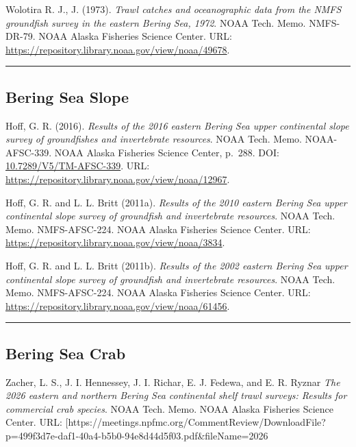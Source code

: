\documentclass[
  letterpaper,
  oneside,
  open=any]{scrbook}
\begin{document}
Wolotira R. J., J. (1973). \emph{Trawl catches and oceanographic data
from the NMFS groundfish survey in the eastern Bering Sea, 1972}. NOAA
Tech. Memo. NMFS-DR-79. NOAA Alaska Fisheries Science Center. URL:
\url{https://repository.library.noaa.gov/view/noaa/49678}.

\begin{center}\rule{0.5\linewidth}{0.5pt}\end{center}

\subsection{Bering Sea Slope}\label{bering-sea-slope}

Hoff, G. R. (2016). \emph{Results of the 2016 eastern Bering Sea upper
continental slope survey of groundfishes and invertebrate resources}.
NOAA Tech. Memo. NOAA-AFSC-339. NOAA Alaska Fisheries Science Center,
p.~288. DOI:
\href{https://doi.org/10.7289\%2FV5\%2FTM-AFSC-339}{10.7289/V5/TM-AFSC-339}.
URL: \url{https://repository.library.noaa.gov/view/noaa/12967}.

Hoff, G. R. and L. L. Britt (2011a). \emph{Results of the 2010 eastern
Bering Sea upper continental slope survey of groundfish and invertebrate
resources}. NOAA Tech. Memo. NMFS-AFSC-224. NOAA Alaska Fisheries
Science Center. URL:
\url{https://repository.library.noaa.gov/view/noaa/3834}.

Hoff, G. R. and L. L. Britt (2011b). \emph{Results of the 2002 eastern
Bering Sea upper continental slope survey of groundfish and invertebrate
resources}. NOAA Tech. Memo. NMFS-AFSC-224. NOAA Alaska Fisheries
Science Center. URL:
\url{https://repository.library.noaa.gov/view/noaa/61456}.

\begin{center}\rule{0.5\linewidth}{0.5pt}\end{center}

\subsection{Bering Sea Crab}\label{bering-sea-crab}

Zacher, L. S., J. I. Hennessey, J. I. Richar, E. J. Fedewa, and E. R.
Ryznar \emph{The 2026 eastern and northern Bering Sea continental shelf
trawl surveys: Results for commercial crab species}. NOAA Tech. Memo.
NOAA Alaska Fisheries Science Center. URL:
{[}https://meetings.npfmc.org/CommentReview/DownloadFile?p=499f3d7e-daf1-40a4-b5b0-94e8d44d5f03.pdf\&fileName=2026
\end{document}
